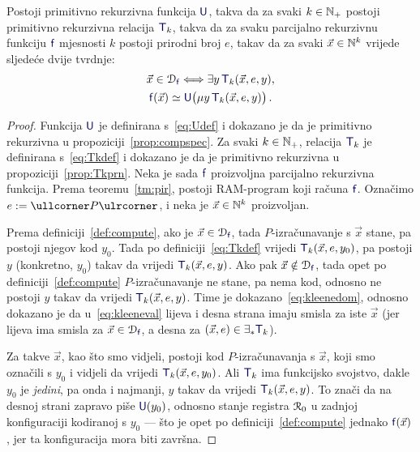 \begin{teorem}\label{tm:Kleene}
Postoji primitivno rekurzivna funkcija $\f U$, takva da za svaki $k\in{\mathbb N}_+$ postoji primitivno rekurzivna relacija $\f T_k$, takva da za svaku parcijalno rekurzivnu funkciju $\f f$ mjesnosti $k$ postoji prirodni broj $e$, takav da za svaki $\vec x\in{\mathbb N}^k$ vrijede sljedeće dvije tvrdnje:
\begin{gather}
    \label{eq:kleenedom}\vec x\in\dom{\f f}\Longleftrightarrow\exists y\,\f T_k(\vec x,e,y)\text,\\
    \label{eq:kleeneval}\f f(\vec x)\simeq\f U\bigl(\mu y\,\f T_k(\vec x,e,y)\bigr)\,\text.
\end{gather}
\end{teorem}
\begin{proof}
	Funkcija $\f U$ je definirana s~\eqref{eq:Udef} i dokazano je da je primitivno rekurzivna u propoziciji~\ref{prop:compspec}. Za svaki $k\in{\mathbb N}_+$, relacija $\f T_k$ je definirana s~\eqref{eq:Tkdef} i dokazano je da je primitivno rekurzivna u propoziciji~\ref{prop:Tkprn}. Neka je sada $\f f$ proizvoljna parcijalno rekurzivna funkcija. Prema teoremu~\ref{tm:pir}, postoji RAM-program koji računa $\f f$. Označimo $e:=\kprog P$, i neka je $\vec x\in{\mathbb N}^k$ proizvoljan.

Prema definiciji~\ref{def:compute}, ako je $\vec x\in\dom{\f f}$, tada $P$-izračunavanje s $\vec x$ stane, pa postoji njegov kod $y_0$. Tada po definiciji~\eqref{eq:Tkdef} vrijedi $\f T_k(\vec x,e,y_0)$, pa postoji $y$ (konkretno, $y_0$) takav da vrijedi $\f T_k(\vec x,e,y)$. Ako pak $\vec x\notin\dom{\f f}$, tada opet po definiciji~\ref{def:compute} $P$-izračunavanje ne stane, pa nema kod, odnosno ne postoji $y$ takav da vrijedi $\f T_k(\vec x,e,y)$. Time je dokazano~\eqref{eq:kleenedom}, odnosno dokazano je da u~\eqref{eq:kleeneval} lijeva i desna strana imaju smisla za iste $\vec x$ (jer lijeva ima smisla za $\vec x\in\dom{\f f}$, a desna za $(\vec x,e)\in\exists_*\f T_k$).

Za takve $\vec x$, kao što smo vidjeli, postoji kod $P$-izračunavanja s $\vec x$, koji smo označili s $y_0$ i vidjeli da vrijedi $\f T_k(\vec x,e,y_0)$. Ali $\f T_k$ ima funkcijsko svojstvo, dakle $y_0$ je \emph{jedini}, pa onda i najmanji, $y$ takav da vrijedi $\f T_k(\vec x,e,y)$. To znači da na desnoj strani zapravo piše $\f U(y_0)$, odnosno stanje registra $\mathcal R_{0}$ u zadnjoj konfiguraciji kodiranoj s $y_0$ --- što je opet po definiciji~\ref{def:compute} jednako $\f f(\vec x)$, jer ta konfiguracija mora biti završna.
\end{proof}

